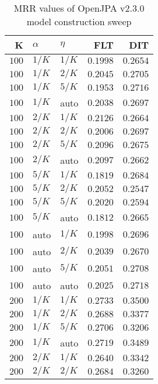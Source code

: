 
\begin{table}
\begin{spacing}{1.2}
\centering
\caption{MRR values of OpenJPA v2.3.0 model construction sweep}
\label{table:openjpa_model_sweep}
\vspace{0.2em}
\parbox{.45\linewidth}{\centering \begin{tabular}{rll|rr}
\toprule
    K &  $\alpha$ &    $\eta$ & FLT &   DIT \\
\midrule
$100$ &  $1/K$ &  $1/K$ &         $0.1998$ & $0.2654$ \\
$100$ &  $1/K$ &  $2/K$ &         $0.2045$ & $0.2705$ \\
$100$ &  $1/K$ &  $5/K$ &         $0.1953$ & $0.2716$ \\
$100$ &  $1/K$ &   auto &         $0.2038$ & $0.2697$ \\
$100$ &  $2/K$ &  $1/K$ &         $0.2126$ & $0.2664$ \\
$100$ &  $2/K$ &  $2/K$ &         $0.2006$ & $0.2697$ \\
$100$ &  $2/K$ &  $5/K$ &         $0.2096$ & $0.2675$ \\
$100$ &  $2/K$ &   auto &         $0.2097$ & $0.2662$ \\
$100$ &  $5/K$ &  $1/K$ &         $0.1819$ & $0.2684$ \\
$100$ &  $5/K$ &  $2/K$ &         $0.2052$ & $0.2547$ \\
$100$ &  $5/K$ &  $5/K$ &         $0.2020$ & $0.2594$ \\
$100$ &  $5/K$ &   auto &         $0.1812$ & $0.2665$ \\
$100$ &   auto &  $1/K$ &         $0.1998$ & $0.2696$ \\
$100$ &   auto &  $2/K$ &         $0.2039$ & $0.2670$ \\
$100$ &   auto &  $5/K$ &         $0.2051$ & $0.2708$ \\
$100$ &   auto &   auto &         $0.2025$ & $0.2718$ \\
$200$ &  $1/K$ &  $1/K$ &         $0.2733$ & $0.3500$ \\
$200$ &  $1/K$ &  $2/K$ &         $0.2688$ & $0.3377$ \\
$200$ &  $1/K$ &  $5/K$ &         $0.2706$ & $0.3206$ \\
$200$ &  $1/K$ &   auto &         $0.2719$ & $0.3489$ \\
$200$ &  $2/K$ &  $1/K$ &         $0.2640$ & $0.3342$ \\
$200$ &  $2/K$ &  $2/K$ &         $0.2684$ & $0.3260$ \\

\end{tabular}}
\end{spacing}
\end{table}
